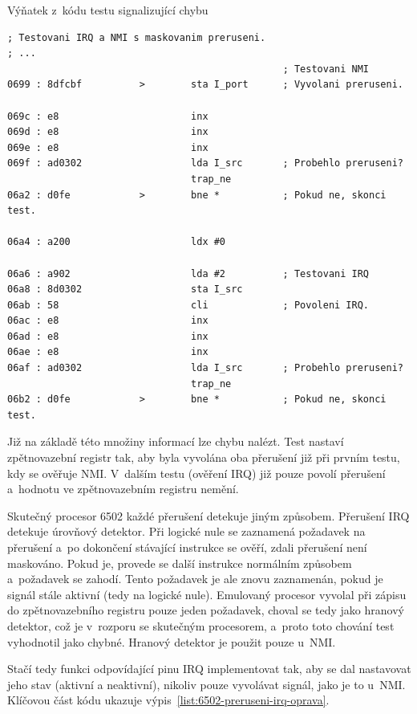 \begin{listing}[htp!]
	\caption{Výňatek z~kódu testu signalizující chybu}
	\label{list:6502-test-hledani-chyby}
	\begin{verbatim}
; Testovani IRQ a NMI s maskovanim preruseni.
; ...
												; Testovani NMI
0699 : 8dfcbf          >        sta I_port      ; Vyvolani preruseni.

069c : e8                       inx
069d : e8                       inx
069e : e8                       inx
069f : ad0302                   lda I_src       ; Probehlo preruseni?
                                trap_ne
06a2 : d0fe            >        bne *           ; Pokud ne, skonci test.

06a4 : a200                     ldx #0

06a6 : a902                     lda #2          ; Testovani IRQ
06a8 : 8d0302                   sta I_src
06ab : 58                       cli             ; Povoleni IRQ.
06ac : e8                       inx
06ad : e8                       inx
06ae : e8                       inx
06af : ad0302                   lda I_src       ; Probehlo preruseni?
                                trap_ne
06b2 : d0fe            >        bne *           ; Pokud ne, skonci test.
	\end{verbatim}
\end{listing}

Již na základě této množiny informací lze chybu nalézt. Test nastaví zpětnovazební registr tak, aby byla vyvolána oba přerušení již při prvním testu, kdy se ověřuje NMI. V~dalším testu (ověření IRQ) již pouze povolí přerušení a~hodnotu ve zpětnovazebním registru nemění.

Skutečný procesor 6502 každé přerušení detekuje jiným způsobem. Přerušení IRQ detekuje úrovňový detektor. Při logické nule se zaznamená požadavek na přerušení a~po dokončení stávající instrukce se ověří, zdali přerušení není maskováno. Pokud je, provede se další instrukce normálním způsobem a~požadavek se zahodí. Tento požadavek je ale znovu zaznamenán, pokud je signál stále aktivní (tedy na logické nule). Emulovaný procesor vyvolal při zápisu do zpětnovazebního registru pouze jeden požadavek, choval se tedy jako hranový detektor, což je v~rozporu se skutečným procesorem, a~proto toto chování test vyhodnotil jako chybné. Hranový detektor je použit pouze u~NMI.

Stačí tedy funkci odpovídající pinu IRQ implementovat tak, aby se dal nastavovat jeho stav (aktivní a neaktivní), nikoliv pouze vyvolávat signál, jako je to u~NMI. Klíčovou část kódu ukazuje výpis~\ref{list:6502-preruseni-irq-oprava}.

